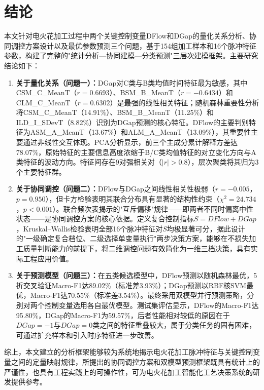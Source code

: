 \documentclass[UTF8,a4paper,12pt]{ctexart}
\begin{document}
\section{结论}

本文针对电火花加工过程中两个关键控制变量DFlow和DGap的量化关系分析、协同调控方案设计以及最优参数预测三个问题，基于154组加工样本和16个脉冲特征参数，构建了完整的"统计分析—协同建模—分类预测"三层次建模框架。主要研究结论如下：

\begin{enumerate}[label=(\arabic*),leftmargin=2em]
\item \textbf{关于量化关系（问题一）：}DGap对C类与B类均值时间特征最为敏感，其中CSM\_C\_MeanT（$r=0.6693$）、BSM\_B\_MeanT（$r=-0.6434$）和CLM\_C\_MeanT（$r=0.6302$）是最强的线性相关特征；随机森林重要性分析将CSM\_C\_MeanT（14.91\%）、BSM\_B\_MeanT（11.25\%）和ILD\_I\_SDevT（8.82\%）识别为DGap预测的核心特征。DFlow的主要判别特征为ASM\_A\_MeanT（13.67\%）和ALM\_A\_MeanT（13.09\%），其重要性主要通过非线性交互体现。PCA分析显示，前三个主成分累计解释方差达78.07\%，原始特征的主要信息高度浓缩于B/C类均值特征的对立变化方向与A类特征的波动方向。特征间存在9对强相关对（$|r|>0.8$），层次聚类将其归为3个主要特征群。

\item \textbf{关于协同调控（问题二）：}DFlow与DGap之间线性相关性极弱（$r=-0.005$，$p=0.950$），但卡方检验表明其联合分布具有显著的结构性约束（$\chi^2=24.734$，$p<0.001$）。联合频次表揭示的"互斥偏移"规律——即两者不同时偏离中性状态——是协同调控方案的核心依据。定义复合控制指标$S=DFlow+DGap$，Kruskal--Wallis检验表明全部16个脉冲特征对$S$均极显著可分，据此设计的"一级确定复合档位、二级选择单变量执行"两步决策方案，能够在不损失加工质量判断能力的前提下，将二维调控问题有效简化为一维三档决策，具有实际工程应用价值。

\item \textbf{关于预测模型（问题三）：}在五类候选模型中，DFlow预测以随机森林最优，5折交叉验证Macro-F1达89.02\%（标准差3.93\%）；DGap预测以RBF核SVM最优，Macro-F1达70.55\%（标准差3.54\%）。最终采用双模型并行预测策略，分别对两个控制变量选用各自最优模型。测试集评估显示，DFlow的Macro-F1达95.80\%，DGap的Macro-F1为59.57\%，后者性能相对较低的原因在于$DGap=-1$与$DGap=0$类之间的特征重叠较大，属于分类任务的固有困难，可通过扩充样本和引入时序特征进一步改善。
\end{enumerate}

综上，本文建立的分析框架能够较为系统地揭示电火花加工脉冲特征与关键控制变量之间的定量映射规律，所提出的协同调控方案和双模型预测框架既具有统计上的严谨性，也具有工程实践上的可操作性，可为电火花加工智能化工艺决策系统的研发提供参考。
\end{document}
